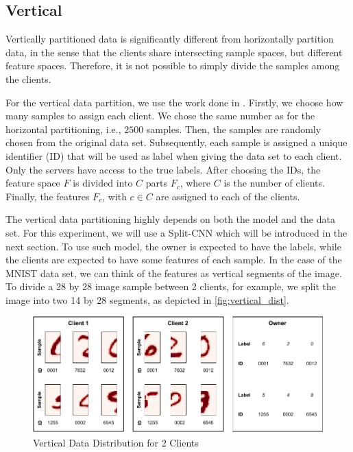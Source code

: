 \subsection{Vertical}\label{subsection:verticalpartitioning}

Vertically partitioned data is significantly different from horizontally partition data, in the sense that the clients share intersecting sample spaces, but different feature spaces. Therefore, it is not possible to simply divide the samples among the clients.

For the vertical data partition, we use the work done in \cite{10.48550/arxiv.2104.00489}. Firstly, we choose how many samples to assign each client. We chose the same number as for the horizontal partitioning, i.e., $2500$ samples. Then, the samples are randomly chosen from the original data set. Subsequently, each sample is assigned a unique identifier (ID) that will be used as label when giving the data set to each client. Only the servers have access to the true labels. After choosing the IDs, the feature space $F$ is divided into $C$ parts $F_c$, where $C$ is the number of clients. Finally, the features $F_c$, with $c \in C$ are assigned to each of the clients.

The vertical data partitioning highly depends on both the model and the data set. For this experiment, we will use a Split-CNN which will be introduced in the next section. To use such model, the owner is expected to have the labels, while the clients are expected to have some features of each sample. In the case of the MNIST data set, we can think of the features as vertical segments of the image. To divide a 28 by 28 image sample between 2 clients, for example, we split the image into two 14 by 28 segments, as depicted in \autoref{fig:vertical_dist}.

\begin{figure}[!ht]
    \centering
    \centering
    \includegraphics[width=1\textwidth]{graphics/vertical_partitioning.pdf}
    \caption{Vertical Data Distribution for 2 Clients}
    \label{fig:vertical_dist}
\end{figure}

